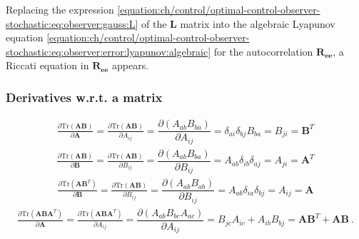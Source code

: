 \documentclass[letterpaper,10pt,english]{jupyterBook}
\begin{document}
\sphinxAtStartPar
Replacing the expression \eqref{equation:ch/control/optimal-control-observer-stochastic:eq:observer:gauss:L} of the \(\mathbf{L}\) matrix into the algebraic Lyapunov equation \eqref{equation:ch/control/optimal-control-observer-stochastic:eq:observer:error:lyapunov:algebraic} for the autocorrelation \(\mathbf{R}_{\mathbf{e}\mathbf{e}}\), a Riccati equation in \(\mathbf{R}_{\mathbf{e} \mathbf{e}}\) appears.
\subsubsection*{Derivatives w.r.t. a matrix}
\begin{equation*}
\begin{split}\frac{\partial \text{Tr}(\mathbf{A} \mathbf{B})}{\partial \mathbf{A}} = \frac{\partial \text{Tr}(\mathbf{A} \mathbf{B})}{\partial A_{ij}} = \dfrac{\partial ( A_{ab} B_{ba} )}{\partial A_{ij}} = \delta_{ai} \delta_{bj} B_{ba} = B_{ji} = \mathbf{B}^T\end{split}
\end{equation*}\begin{equation*}
\begin{split}\frac{\partial \text{Tr}(\mathbf{A} \mathbf{B})}{\partial \mathbf{B}} = \frac{\partial \text{Tr}(\mathbf{A} \mathbf{B})}{\partial B_{ij}} = \dfrac{\partial ( A_{ab} B_{ba} )}{\partial B_{ij}} = A_{ab} \delta_{ib} \delta_{aj} = A_{ji} = \mathbf{A}^T\end{split}
\end{equation*}\begin{equation*}
\begin{split}\frac{\partial \text{Tr}(\mathbf{A} \mathbf{B}^T)}{\partial \mathbf{B}} = \frac{\partial \text{Tr}(\mathbf{A} \mathbf{B})}{\partial B_{ij}} = \dfrac{\partial ( A_{ab} B_{ab} )}{\partial B_{ij}} = A_{ab} \delta_{ia} \delta_{bj} = A_{ij} = \mathbf{A}\end{split}
\end{equation*}\begin{equation*}
\begin{split}\frac{\partial \text{Tr}(\mathbf{A} \mathbf{B} \mathbf{A}^T)}{\partial \mathbf{A}} = \frac{\partial \text{Tr}(\mathbf{A} \mathbf{B} \mathbf{A}^T)}{\partial A_{ij}} = \dfrac{\partial ( A_{ab} B_{bc} A_{ac} )}{\partial A_{ij}} = B_{jc} A_{ic} + A_{ib} B_{bj} = \mathbf{A} \mathbf{B}^T + \mathbf{A} \mathbf{B} \ .\end{split}
\end{equation*}\begin{equation*}

\end{equation*}
\end{document}
